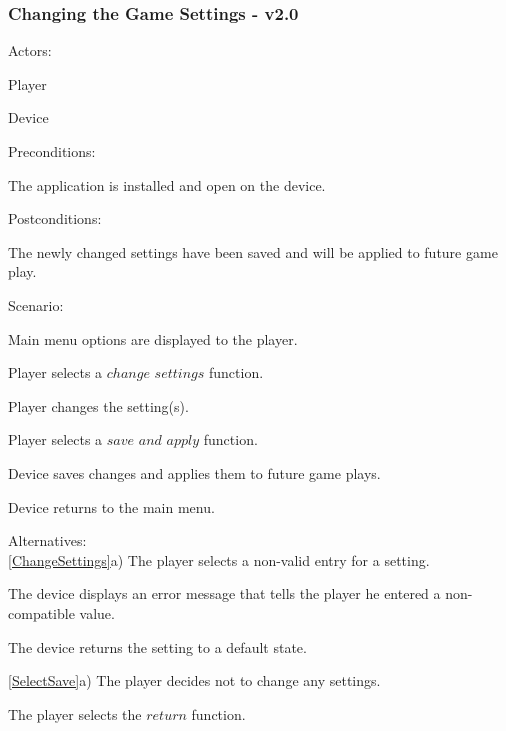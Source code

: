 \documentclass[12pt]{article}
\newenvironment{itemize*}%
  {\begin{itemize}%
  	\setlength{\parsep}{0pt}
    \setlength{\itemsep}{0pt}%
    \setlength{\parskip}{0pt}}%
  {\end{itemize}}
\newenvironment{enumerate*}%
  {\begin{enumerate}%
  	\setlength{\parsep}{0pt}
    \setlength{\itemsep}{0pt}%
    \setlength{\parskip}{0pt}}%
  {\end{enumerate}}
\begin{document}
\subsubsection*{Changing the Game Settings - v2.0}
Actors:
\begin{itemize*}
\item Player
\item Device
\end{itemize*}
Preconditions:
\begin{itemize*}
\item The application is installed and open on the device.
\end{itemize*}
Postconditions:
\begin{itemize*}
\item The newly changed settings have been saved and will be applied to 
  future game play.
\end{itemize*}
Scenario:
\begin{enumerate*}
\item Main menu options are displayed to the player.
\item \label{SelectChangeSettings}Player selects a $change$ $settings$ 
  function.
\item \label{ChangeSettings}Player changes the setting(s).
\item \label{SelectSave}Player selects a $save$ $and$ $apply$ function.
\item \label{SystemSaves}Device saves changes and applies them to future 
  game plays.
\item \label{ReturnToMainMenu}Device returns to the main menu.
\end{enumerate*}
Alternatives:\\
\ref{ChangeSettings}a) The player selects a non-valid entry for a setting.
\begin{enumerate*}
\item The device displays an error message that tells the player he 
  entered a non-compatible value.
\item The device returns the setting to a default state.
\end{enumerate*}
\ref{SelectSave}a) The player decides not to change any settings.
\begin{enumerate*}
\item The player selects the $return$ function.
\end{enumerate*}
\onehalfspacing

\singlespacing
\end{document}
